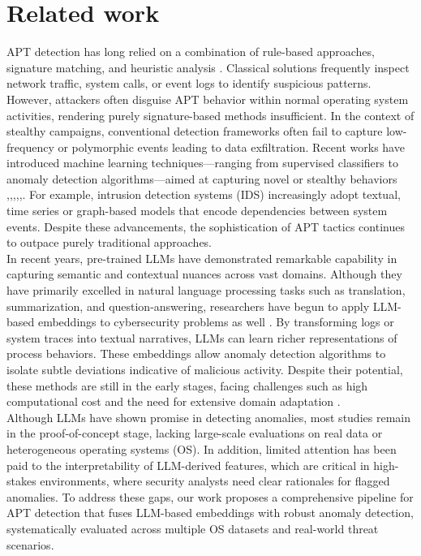 \section{Related work}
APT detection has long relied on a combination of rule-based approaches, signature matching, and heuristic analysis \cite{che2024systematic}. Classical solutions frequently inspect network traffic, system calls, or event logs to identify suspicious patterns. However, attackers often disguise APT behavior within normal operating system activities, rendering purely signature-based methods insufficient. In the context of stealthy campaigns, conventional detection frameworks often fail to capture low-frequency or polymorphic events leading to data exfiltration. Recent works have introduced machine learning techniques—ranging from supervised classifiers to anomaly detection algorithms—aimed at capturing novel or stealthy behaviors \cite{koufakou_2007},\cite{smets2011},\cite{narita_2008},\cite{BerradaCBMMTW20},\cite{Benabderrahmane21},\cite{DBLP:journals/fgcs/BenabderrahmaneHVCR24}. For example, intrusion detection systems (IDS) increasingly adopt textual, time series or graph-based models that encode dependencies between system events. Despite these advancements, the sophistication of APT tactics continues to outpace purely traditional approaches.\\
In recent years, pre-trained LLMs have demonstrated remarkable capability in capturing semantic and contextual nuances across vast domains. Although they have primarily excelled in natural language processing tasks such as translation, summarization, and question-answering, researchers have begun to apply LLM-based embeddings to cybersecurity problems as well \cite{chen2024survey}. By transforming logs or system traces into textual narratives, LLMs can learn richer representations of process behaviors. These embeddings allow anomaly detection algorithms to isolate subtle deviations indicative of malicious activity.
%
Despite their potential, these methods are still in the early stages, facing challenges such as high computational cost and the need for extensive domain adaptation \cite{bayer2024cysecbert}.\\
Although LLMs have shown promise in detecting anomalies, most studies remain in the proof-of-concept stage, lacking large-scale evaluations on real data or heterogeneous operating systems (OS). In addition, limited attention has been paid to the interpretability of LLM-derived features, which are critical in high-stakes environments, where security analysts need clear rationales for flagged anomalies. To address these gaps, our work proposes a comprehensive pipeline for APT detection that fuses LLM-based embeddings with robust anomaly detection, systematically evaluated across multiple OS datasets and real-world threat scenarios.
%